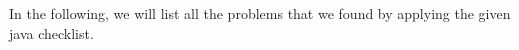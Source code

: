 
In the following, we will list all the problems that we found by applying the given java checklist.